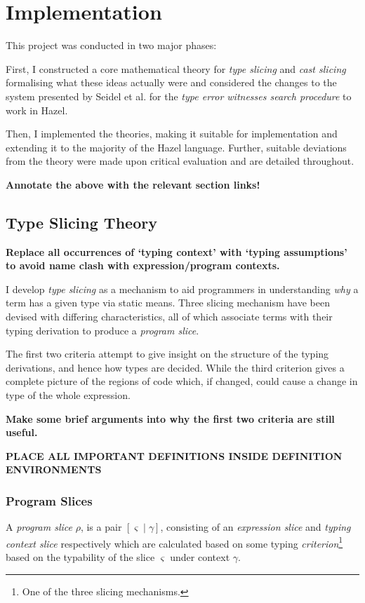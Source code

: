 \chapter{Implementation}\label{chap:Implementation}
This project was conducted in two major phases:

First, I constructed a core mathematical theory for \textit{type slicing} and \textit{cast slicing} formalising what these ideas actually were and considered the changes to the system presented by Seidel et al. for the \textit{type error witnesses search procedure} to work in Hazel.  

Then, I implemented the theories, making it suitable for implementation and extending it to the majority of the Hazel language. Further, suitable deviations from the theory were made upon critical evaluation and are detailed throughout.

\textbf{Annotate the above with the relevant section links!}
\section{Type Slicing Theory}\label{sec:TypeSlicingTheory}
\textbf{Replace all occurrences of `typing context' with `typing assumptions' to avoid name clash with expression/program contexts.}

I develop \textit{type slicing} as a mechanism to aid programmers in understanding \textit{why} a term has a given type via static means. Three slicing mechanism have been devised with differing characteristics, all of which associate terms with their typing derivation to produce a \textit{program slice}. 

The first two criteria attempt to give insight on the structure of the typing derivations, and hence how types are decided. While the third criterion gives a complete picture of the regions of code which, if changed, could cause a change in type of the whole expression.

\textbf{Make some brief arguments into why the first two criteria are still useful.}

\textbf{PLACE ALL IMPORTANT DEFINITIONS INSIDE DEFINITION ENVIRONMENTS}

\subsection{Program Slices}
A \textit{program slice} $\rho$, is a pair $[\varsigma \mid \gamma]$, consisting of an \textit{expression slice} and \textit{typing context slice} respectively which are calculated based on some typing \textit{criterion}\footnote{One of the three slicing mechanisms.} based on the typability of the slice $\varsigma$ under context $\gamma$. 

